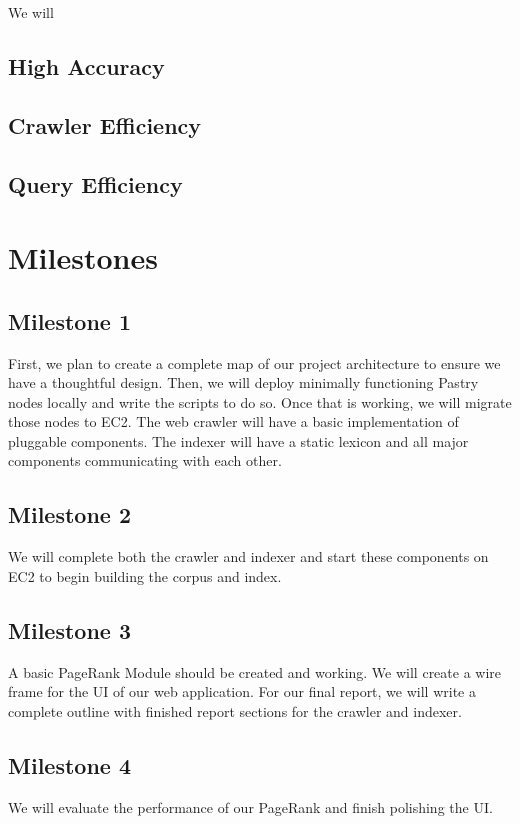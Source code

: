 \documentclass[11pt, letterpaper, oneside, twocolumn]{article}
\begin{document}
We will 

\subsection{ High Accuracy }
\subsection{ Crawler Efficiency }
\subsection{ Query Efficiency }

\section{ Milestones }

\subsection{Milestone 1}
First, we plan to create a complete map of our project architecture to ensure we
have a thoughtful design. Then, we will deploy minimally functioning
Pastry nodes locally and write the scripts to do so. Once that is
working, we will migrate those nodes to EC2. The web crawler will have a basic
implementation of pluggable components. The indexer will have a static lexicon
and all major components communicating with each other. 


\subsection{Milestone 2}
We will complete both the crawler and indexer and start these components on EC2
to begin building the corpus and index. 


\subsection{Milestone 3}
A basic PageRank Module should be created and working. We will create a wire
frame for the UI of our web application. For our final report, we will write a complete outline with finished report sections for the crawler
and indexer. 


\subsection{Milestone 4}
We will evaluate the performance of our PageRank and finish polishing the UI. 
\end{document}
